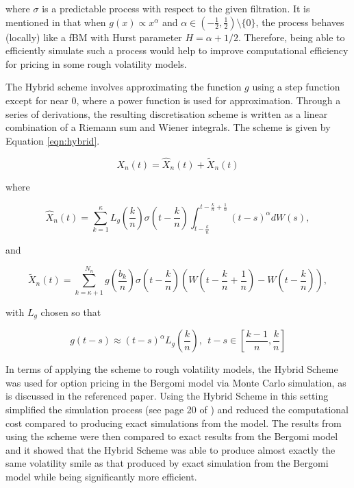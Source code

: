\documentclass[12pt,oneside]{article}
\begin{document}
where $\sigma$ is a predictable process with respect to the given filtration. It is mentioned in \cite{Bennedsen_2017} that when $g(x) \propto x^\alpha$ and $\alpha \in (-\frac{1}{2}, \frac{1}{2}) \setminus \{0\}$, the process behaves (locally) like a fBM with Hurst parameter $H=\alpha+1/2$.  Therefore, being able to efficiently simulate such a process would help to improve computational efficiency for pricing in some rough volatility models.  

The Hybrid scheme involves approximating the function $g$ using a step function except for near 0, where a power function is used for approximation. Through a series of derivations, the resulting discretisation scheme is written as a linear combination of a Riemann sum and Wiener integrals. The scheme is given by Equation
\ref{eqn:hybrid}.  

\begin{equation}
\label{eqn:hybrid}
X_n(t) = \hat{X}_n(t) + \tilde{X}_n(t)
\end{equation}

where

\begin{equation}
\hat{X}_n(t) = \sum_{k=1}^{\kappa} L_g(\frac{k}{n}) \sigma (t-\frac{k}{n}) \int_{t-\frac{k}{n}}^{t-\frac{k}{n}+\frac{1}{n}}(t-s)^\alpha dW(s),
\end{equation}

and

\begin{equation}
\tilde{X}_n(t)=\sum_{k=\kappa+1}^{N_n}g(\frac{b_k}{n})\sigma(t-\frac{k}{n})(W(t-\frac{k}{n}+\frac{1}{n})-W(t-\frac{k}{n})),
\end{equation}

with $L_g$ chosen so that

\begin{equation}
g(t-s) \approx (t-s)^\alpha L_g(\frac{k}{n}), \ \ t-s \in [\frac{k-1}{n},\frac{k}{n}]
\end{equation}

In terms of applying the scheme to rough volatility models, the Hybrid Scheme was used for option pricing in the Bergomi model via Monte Carlo simulation, as is discussed in the referenced paper. Using the Hybrid Scheme in this setting simplified the simulation process (see page 20 of \cite{Bennedsen_2017}) and reduced the computational cost compared to producing exact simulations from the model. The results from using the scheme were then compared to exact results from the Bergomi model and it showed that the Hybrid Scheme was able to produce almost exactly the same volatility smile as that produced by exact simulation from the Bergomi model while being significantly more efficient.
\end{document}
